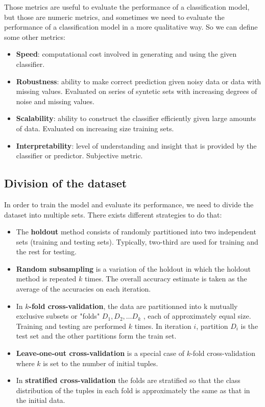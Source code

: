 \documentclass[12pt, openany]{report}
\theoremstyle{definition}
\begin{document}
Those metrics are useful to evaluate the performance of a classification model, but those are numeric metrics, and sometimes we need to evaluate the performance of a classification model in a more qualitative way. So we can define some other metrics:
\begin{itemize}
    \item \textbf{Speed}: computational cost involved in generating and using the given classifier.
    \item \textbf{Robustness}: ability to make correct prediction given noisy data or data with missing values. Evaluated on series of syntetic sets with increasing degrees of noise and missing values.
    \item \textbf{Scalability}: ability to construct the classifier efficiently given large amounts of data. Evaluated on increasing size training sets.
    \item \textbf{Interpretability}: level of understanding and insight that is provided by the classifier or predictor. Subjective metric.
\end{itemize}
\subsection{Division of the dataset}
In order to train the model and evaluate its performance, we need to divide the dataset into multiple sets. There exists different strategies to do that:
\begin{itemize}
    \item The \textbf{holdout} method consists of randomly partitioned into two independent sets (training and testing sets). Typically, two-third are used for training and the rest for testing.
    \item \textbf{Random subsampling} is a variation of the holdout in which the holdout method is repeated $k$ times. The overall accuracy estimate is taken as the average of the accuracies on each iteration.
    \item In \textbf{$k$-fold cross-validation}, the data are partitionned into k mutually exclusive subsets or "folds" $D_1, D_2,\dots D_k$ , each of approximately equal size. Training and testing are performed $k$ times. In iteration $i$, partition $D_i$ is the test set and the other partitions form the train set.
    \item \textbf{Leave-one-out cross-validation} is a special case of $k$-fold cross-validation where $k$ is set to the number of initial tuples.
    \item In \textbf{stratified cross-validation} the folds are stratified so that the class distribution of the tuples in each fold is approximately the same as that in the initial data.
\end{itemize}
\end{document}
